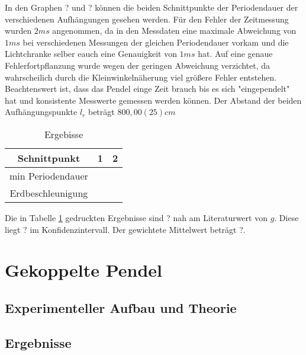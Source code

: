 \documentclass[11pt, a4paper]{article}
\begin{document}
    In den Graphen ? und ? können die beiden Schnittpunkte der Periodendauer der verschiedenen
    Aufhängungen gesehen werden. Für den Fehler der Zeitmessung
    wurden $2ms$ angenommen, da in den Messdaten eine maximale Abweichung von $1ms$ bei verschiedenen Messungen 
    der gleichen Periodendauer vorkam und die Lichtchranke selber eauch eine Genauigkeit von $1ms$ hat.
    Auf eine genaue Fehlerfortpflanzung wurde wegen der geringen Abweichung verzichtet, da wahrscheilich
    durch die Kleinwinkelnäherung viel größere Fehler entstehen.
    Beachtenswert ist, dass das Pendel einge Zeit brauch bis es sich "eingependelt" hat und konsistente Messwerte
    gemessen werden können. Der Abstand der beiden Aufhängungspunkte $l_r$ beträgt $800,00(25)cm$

    \begin{table}
        \centering
        \begin{tabular}{c|c|c}
            Schnittpunkt & 1 & 2 \\ \hline
            min Periodendauer & & \\ \hline
            
            Erdbeschleunigung & &
        \end{tabular}
        \caption{Ergebisse}
        \label{ergrev}
    \end{table}

    Die in Tabelle \ref{ergrev} gedruckten Ergebnisse sind ? nah am Literaturwert von $g$. Diese liegt ?
    im Konfidenzintervall. Der gewichtete Mittelwert beträgt ?.

    \section{Gekoppelte Pendel}

    \subsection{Experimenteller Aufbau und Theorie}



    \subsection{Ergebnisse}
\end{document}
